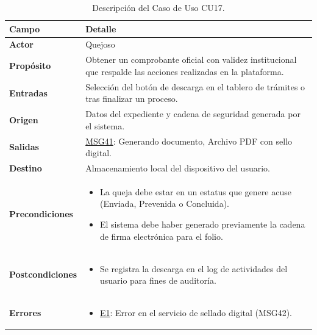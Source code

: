 \begin{appendices}
\begin{table}[htbp]
\centering
\small
{}
\begin{tabular}{|p{3.5cm}|p{10.5cm}|}
\hline
\rowcolor[HTML]{EFEFEF} 
\textbf{Campo} & \textbf{Detalle} \\ \hline
\textbf{Actor} & Quejoso \\ \hline
\textbf{Propósito} & Obtener un comprobante oficial con validez institucional que respalde las acciones realizadas en la plataforma. \\ \hline
\textbf{Entradas} & Selección del botón de descarga en el tablero de trámites o tras finalizar un proceso. \\ \hline
\textbf{Origen} & Datos del expediente y cadena de seguridad generada por el sistema. \\ \hline
\textbf{Salidas} & \hyperlink{msg:MSG41}{MSG41}: Generando documento, Archivo PDF con sello digital. \\ \hline
\textbf{Destino} & Almacenamiento local del dispositivo del usuario. \\ \hline
\textbf{Precondiciones} & 
\begin{itemize}[nosep, leftmargin=*]
    \item La queja debe estar en un estatus que genere acuse (Enviada, Prevenida o Concluida).
    \item El sistema debe haber generado previamente la cadena de firma electrónica para el folio.
\end{itemize} \\ \hline
\textbf{Postcondiciones} & 
\begin{itemize}[nosep, leftmargin=*]
    \item Se registra la descarga en el log de actividades del usuario para fines de auditoría.
\end{itemize} \\ \hline
\textbf{Errores} & 
\begin{itemize}[nosep, leftmargin=*]
    \item \hyperlink{err:E22}{E1}: Error en el servicio de sellado digital (MSG42).
\end{itemize} \\ \hline
\end{tabular}
\caption{Descripción del Caso de Uso CU17.}
\label{tab:cu17_especificacion}
\end{table}


\end{appendices}
